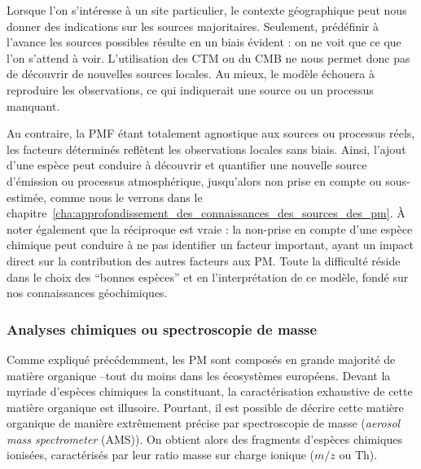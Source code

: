 Lorsque l'on s'intéresse à un site particulier, le contexte géographique peut nous donner
des indications sur les sources majoritaires. Seulement, prédéfinir à l'avance les sources
possibles résulte en un biais évident : on ne voit que ce que l'on s'attend à voir.
L'utilisation des CTM ou du CMB ne nous permet donc pas de découvrir de nouvelles sources
locales. Au mieux, le modèle échouera à reproduire les observations, ce qui indiquerait
une source ou un processus manquant.

Au contraire, la PMF étant totalement agnostique aux sources ou processus réels, les
facteurs déterminés reflètent les observations locales sans biais. Ainsi, l'ajout d'une
espèce peut conduire à découvrir et quantifier une nouvelle source d'émission ou processus
atmosphérique, jusqu'alors non prise en compte ou sous-estimée, comme nous le verrons dans
le chapitre~\ref{cha:approfondissement_des_connaissances_des_sources_des_pm}. À noter
également que la réciproque est vraie : la non-prise en compte d'une espèce chimique peut
conduire à ne pas identifier un facteur important, ayant un impact direct sur la
contribution des autres facteurs aux PM.
Toute la difficulté réside dans le choix des ``bonnes espèces'' et en l'interprétation de
ce modèle, fondé sur nos connaissances géochimiques.

\subsubsection{Analyses chimiques ou spectroscopie de masse}%
\label{ssub:analyses_chimiques_ou_spectroscopie_de_masse}

Comme expliqué précédemment, les PM sont composés en grande majorité de matière organique
--tout du moins dans les écosystèmes européens.  Devant la myriade d'espèces chimiques la
constituant, la caractérisation exhaustive de cette matière organique est illusoire.
Pourtant, il est possible de décrire cette matière organique de manière extrêmement
précise par spectroscopie de masse (\textit{aerosol mass spectrometer} (AMS)). On obtient alors des
fragments d'espèces chimiques ionisées, caractérisés par leur ratio masse sur charge ionique
($m/z$ ou Th).

